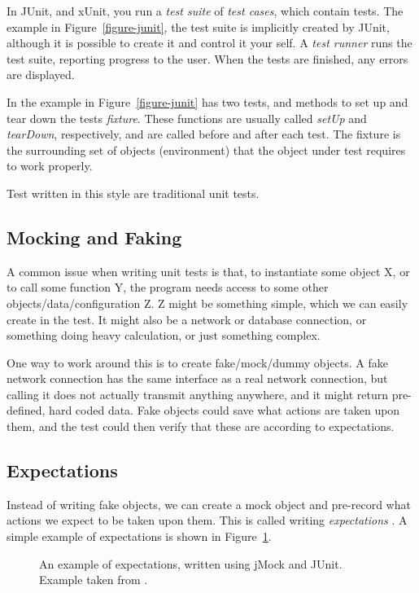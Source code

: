 \documentclass[a4paper,11pt]{kth-mag}
\begin{document}
In JUnit, and xUnit, you run a \textit{test suite} of \textit{test cases},
which contain tests. The example in Figure~\ref{figure-junit}, the test suite
is implicitly created by JUnit, although it is possible to create it and
control it your self. A \textit{test runner} runs the test suite, reporting
progress to the user.  When the tests are finished, any errors are displayed.

In the example in Figure~\ref{figure-junit} has two tests, and methods to set
up and tear down the tests \textit{fixture}. These functions are usually called
\textit{setUp} and \textit{tearDown}, respectively, and are called before and
after each test. The fixture is the surrounding set of objects (environment)
that the object under test requires to work properly.

Test written in this style are traditional unit tests.


\subsection{Mocking and Faking}

A common issue when writing unit tests is that, to instantiate some object X,
or to call some function Y, the program needs access to some other
objects/data/configuration Z. Z might be something simple, which we can easily
create in the test. It might also be a network or database connection, or
something doing heavy calculation, or just something complex.

One way to work around this is to create fake/mock/dummy objects. A fake
network connection has the same interface as a real network connection, but
calling it does not actually transmit anything anywhere, and it might return
pre-defined, hard coded data. Fake objects could save what actions are taken
upon them, and the test could then verify that these are according to
expectations.


\subsection{Expectations}

Instead of writing fake objects, we can create a mock object and pre-record
what actions we expect to be taken upon them. This is called writing
\textit{expectations} \cite{fowler07expectations}. A simple example of
expectations is shown in Figure~\ref{figure-expectations}.

\begin{figure}[h!]
	\begin{center}
	\begin{minipage}{0.7\textwidth}
		\lstset{language=Java}
		
	\end{minipage}
	\end{center}

	\caption{An example of expectations, written using jMock and JUnit.
	Example taken from \cite{fowler07expectations}.}
	\label{figure-expectations}
\end{figure}
\end{document}
